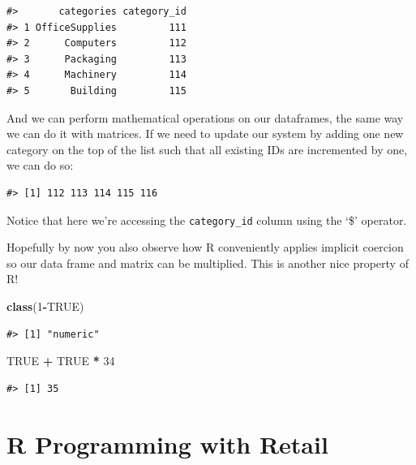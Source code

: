 \documentclass[]{article}
\newenvironment{Shaded}{\begin{snugshade}}{\end{snugshade}}
\newcommand{\DecValTok}[1]{\textcolor[rgb]{0.00,0.00,0.81}{#1}}
\newcommand{\KeywordTok}[1]{\textcolor[rgb]{0.13,0.29,0.53}{\textbf{#1}}}
\newcommand{\NormalTok}[1]{#1}
\newcommand{\OperatorTok}[1]{\textcolor[rgb]{0.81,0.36,0.00}{\textbf{#1}}}
\newcommand{\OtherTok}[1]{\textcolor[rgb]{0.56,0.35,0.01}{#1}}
\newcommand{\StringTok}[1]{\textcolor[rgb]{0.31,0.60,0.02}{#1}}
\begin{document}
\begin{verbatim}
#>       categories category_id
#> 1 OfficeSupplies         111
#> 2      Computers         112
#> 3      Packaging         113
#> 4      Machinery         114
#> 5       Building         115
\end{verbatim}

And we can perform mathematical operations on our dataframes, the same
way we can do it with matrices. If we need to update our system by
adding one new category on the top of the list such that all existing
IDs are incremented by one, we can do so:

\begin{Shaded}
\end{Shaded}

\begin{verbatim}
#> [1] 112 113 114 115 116
\end{verbatim}

Notice that here we're accessing the \texttt{category\_id} column using
the `\$' operator.

Hopefully by now you also observe how R conveniently applies implicit
coercion so our data frame and matrix can be multiplied. This is another
nice property of R!

\begin{Shaded}
\begin{Highlighting}[]
\KeywordTok{class}\NormalTok{(}\DecValTok{1}\OperatorTok{-}\OtherTok{TRUE}\NormalTok{)}
\end{Highlighting}
\end{Shaded}

\begin{verbatim}
#> [1] "numeric"
\end{verbatim}

\begin{Shaded}
\begin{Highlighting}[]
\OtherTok{TRUE} \OperatorTok{+}\StringTok{ }\OtherTok{TRUE} \OperatorTok{*}\StringTok{ }\DecValTok{34}
\end{Highlighting}
\end{Shaded}

\begin{verbatim}
#> [1] 35
\end{verbatim}

\hypertarget{r-programming-with-retail}{%
\section{R Programming with Retail}\label{r-programming-with-retail}}
\end{document}
